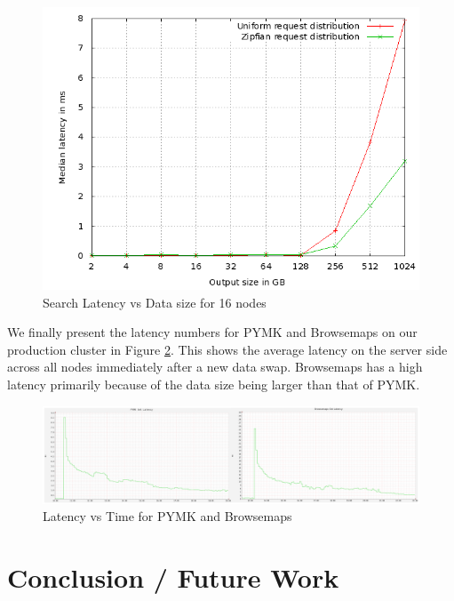 \documentclass[twocolumn]{article}
\begin{document}
\begin{figure}
  \centering
    \includegraphics[scale=0.35]{images/search_16node.png}
  \caption{Search Latency vs Data size for 16 nodes}
  \label{16search}
\end{figure}


We finally present the latency numbers for PYMK and Browsemaps on our production cluster in Figure \ref{production}. This shows the average latency on the server side across all nodes immediately after a new data swap. Browsemaps has a high latency primarily because of the data size being larger than that of PYMK.

\begin{figure}
  \centering
    \includegraphics[scale=0.23]{images/get_latency.png}
  \caption{Latency vs Time for PYMK and Browsemaps}
  \label{production}
\end{figure}





\section{Conclusion / Future Work}
\label{sec:conclusion}
\end{document}
